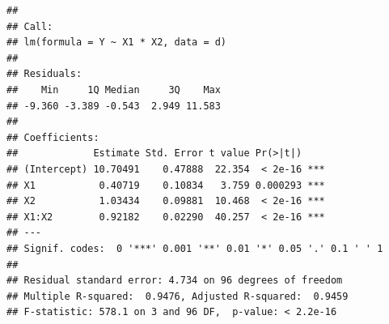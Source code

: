 \documentclass[
]{book}
\newenvironment{Shaded}{\begin{snugshade}}{\end{snugshade}}
\newcommand{\AttributeTok}[1]{\textcolor[rgb]{0.13,0.29,0.53}{#1}}
\newcommand{\CommentTok}[1]{\textcolor[rgb]{0.56,0.35,0.01}{\textit{#1}}}
\newcommand{\DecValTok}[1]{\textcolor[rgb]{0.00,0.00,0.81}{#1}}
\newcommand{\FloatTok}[1]{\textcolor[rgb]{0.00,0.00,0.81}{#1}}
\newcommand{\FunctionTok}[1]{\textcolor[rgb]{0.13,0.29,0.53}{\textbf{#1}}}
\newcommand{\NormalTok}[1]{#1}
\newcommand{\OtherTok}[1]{\textcolor[rgb]{0.56,0.35,0.01}{#1}}
\newcommand{\SpecialCharTok}[1]{\textcolor[rgb]{0.81,0.36,0.00}{\textbf{#1}}}
\begin{document}
\begin{verbatim}
## 
## Call:
## lm(formula = Y ~ X1 * X2, data = d)
## 
## Residuals:
##    Min     1Q Median     3Q    Max 
## -9.360 -3.389 -0.543  2.949 11.583 
## 
## Coefficients:
##             Estimate Std. Error t value Pr(>|t|)    
## (Intercept) 10.70491    0.47888  22.354  < 2e-16 ***
## X1           0.40719    0.10834   3.759 0.000293 ***
## X2           1.03434    0.09881  10.468  < 2e-16 ***
## X1:X2        0.92182    0.02290  40.257  < 2e-16 ***
## ---
## Signif. codes:  0 '***' 0.001 '**' 0.01 '*' 0.05 '.' 0.1 ' ' 1
## 
## Residual standard error: 4.734 on 96 degrees of freedom
## Multiple R-squared:  0.9476, Adjusted R-squared:  0.9459 
## F-statistic: 578.1 on 3 and 96 DF,  p-value: < 2.2e-16
\end{verbatim}

\begin{Shaded}
\end{Shaded}
\end{document}
